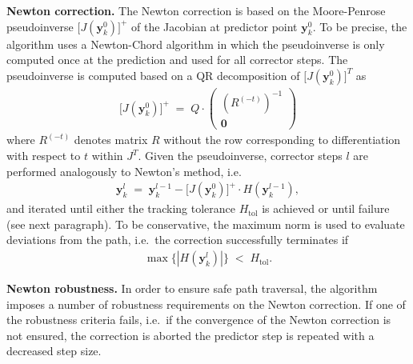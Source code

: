 \documentclass[11pt,fleqn]{article}
\begin{document}
\textbf{Newton correction.} %
The Newton correction is based on the Moore-Penrose pseudoinverse $\bigl[ J(\bm{y}_k^0) \bigr]^+$ of the Jacobian at predictor point $\bm{y}_k^0$. To be precise, the algorithm uses a Newton-Chord algorithm in which the pseudoinverse is only computed once at the prediction and used for all corrector steps. The pseudoinverse is computed based on a QR decomposition of $\bigl[ J(\bm{y}_k^0) \bigr]^T$ as
\begin{align*}
	\bigl[ J(\bm{y}_k^0) \bigr]^+ \;=\; Q \cdot \begin{pmatrix} (R^{(-t)})^{-1} \\ \bm{0} \end{pmatrix}
\end{align*}
where $R^{(-t)}$ denotes matrix $R$ without the row corresponding to differentiation with respect to $t$ within $J^T$. Given the pseudoinverse, corrector steps $l$ are performed analogously to Newton's method, i.e.\
\begin{align*}
	\bm{y}_k^l \;=\; \bm{y}_k^{l-1} - \bigl[ J(\bm{y}_k^0) \bigr]^+ \cdot H(\bm{y}_k^{l-1}),
\end{align*}
and iterated until either the tracking tolerance $H_{\text{tol}}$ is achieved or until failure (see next paragraph). To be conservative, the maximum norm is used to evaluate deviations from the path, i.e.\ the correction successfully terminates if
\begin{align*}
	\max \bigl\{ |H(\bm{y}_k^l)| \bigr\} \;<\; H_{\text{tol}}.
\end{align*}


\textbf{Newton robustness.} %
In order to ensure safe path traversal, the algorithm imposes a number of robustness requirements on the Newton correction. If one of the robustness criteria fails, i.e.\ if the convergence of the Newton correction is not ensured, the correction is aborted the predictor step is repeated with a decreased step size. 
\end{document}
